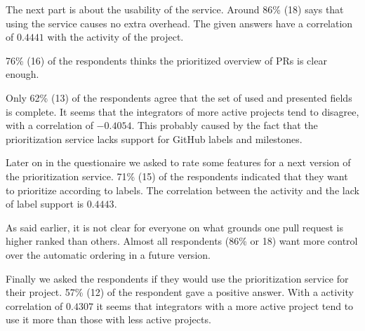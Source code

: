 \documentclass[conference]{IEEEtran}
\begin{document}
The next part is about the usability of the service.
Around 86\% (18) says that using the service causes no extra overhead.
The given answers have a correlation of $0.4441$ with the activity of the project.

76\% (16) of the respondents thinks the prioritized overview of PRs is clear enough.

Only 62\% (13) of the respondents agree that the set of used and presented fields is complete.
It seems that the integrators of more active projects tend to disagree, with a correlation of $-0.4054$.
This probably caused by the fact that the prioritization service lacks support for GitHub labels and milestones.

Later on in the questionaire we asked to rate some features for a next version of the prioritization service.
71\% (15) of the respondents indicated that they want to prioritize according to labels.
The correlation between the activity and the lack of label support is $0.4443$.

As said earlier, it is not clear for everyone on what grounds one pull request is higher ranked than others.
Almost all respondents (86\% or 18) want more control over the automatic ordering in a future version.

Finally we asked the respondents if they would use the prioritization service for their project.
57\% (12) of the respondent gave a positive answer.
With a activity correlation of $0.4307$ it seems that integrators with a more active project tend to use it more than those with less active projects.
\end{document}
